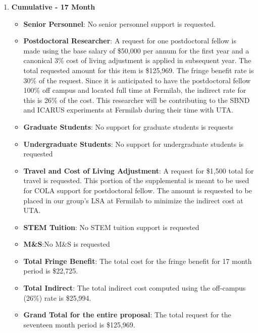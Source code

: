 \begin{enumerate}
\item{\bf Cumulative - 17 Month}

\begin{itemize}[noitemsep,nolistsep]
\item{{\bf Senior Personnel}: No senior personnel support is requested.}

\item {{\bf Postdoctoral Researcher}: A request for one postdoctoral fellow is made using the base salary of \$50,000 per annum for the first year and a canonical 3\% cost of living adjustment is applied in subsequent year.  The total requested amount for this item is \$125,969. The fringe benefit rate is 30\% of the request.  Since it is anticipated to have the postdoctoral fellow 100\% off campus and located full time at Fermilab, the indirect rate for this is 26\% of the cost.  This researcher will be contributing to the SBND and ICARUS experiments at Fermilab during their time with UTA.} 

\item{{\bf Graduate Students}: No support for graduate students is requests}

\item {{\bf Undergraduate Students}: No support for undergraduate students is requested}

\item{{\bf Travel and Cost of Living Adjustment}: A request for \$1,500 total for travel is requested.  This portion of the supplemental is meant to be used for COLA support for postdoctoral fellow. The amount is requested to be placed in our group’s LSA at Fermilab to minimize the indirect cost at UTA.}

\item {{\bf STEM Tuition}: No STEM tuition support is requested}

\item {{\bf M\&S}:No M\&S is requested}

\item {{\bf Total Fringe Benefit}: The total cost for the fringe benefit for 17 month period is \$22,725.}

\item {{\bf Total Indirect}: The total indirect cost computed using the off-campus (26\%) rate is \$25,994.}

\item {{\bf Grand Total for the entire proposal}: The total request for the seventeen month period is \$125,969.}


\end{itemize}
\end{enumerate}
